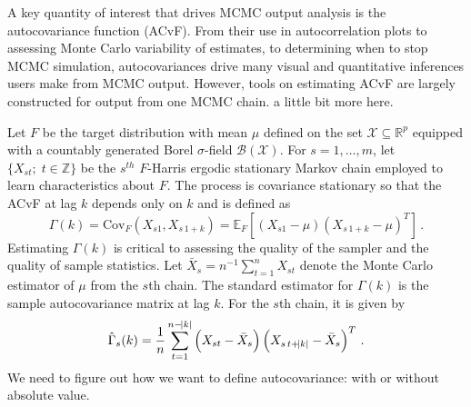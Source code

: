 \documentclass[11pt]{article}
\newcommand{\Cov}{\text{Cov}}
\newcommand{\X}{\mathcal{X}}
\theoremstyle{remark}
\begin{document}
A key quantity of interest that drives MCMC output analysis is the autocovariance function (ACvF). From their use in autocorrelation plots to assessing Monte Carlo variability of estimates, to determining when to stop MCMC simulation, autocovariances drive many visual and quantitative inferences users make from MCMC output. However, tools on estimating ACvF are largely constructed for output from one MCMC chain. {\color{blue} a little bit more here}.


Let $F$ be the target distribution with mean $\mu$ defined on the set $\X \subseteq \mathbb{R}^p$ equipped with a countably generated Borel $\sigma$-field $\mathcal{B}(\X)$. For $s = 1, \dots, m$, let $\{X_{st}; \; t \in \mathbb{Z}\}$ be the $s^{th}$ $F$-Harris ergodic stationary Markov chain \citep[see][for definitions]{meyn:twee:2009} employed to learn characteristics about $F$.
The process is covariance stationary so that
the ACvF at lag $k$ depends only on $k$ and is defined as 
%
\[
    \Gamma(k) = \Cov_F(X_{s1}, X_{s\,1+k})= \mathbb{E}_F \left[(X_{s1} - \mu)(X_{s\,1+k} - \mu)^T \right]\,.
\]
Estimating $\Gamma(k)$ is critical to assessing the quality of the sampler and the quality of sample statistics. Let $\bar{X}_s = n^{-1} \sum_{t=1}^{n} X_{st}$ denote the Monte Carlo estimator of $\mu$ from the $s$th chain. The standard estimator for $\Gamma(k)$ is the sample autocovariance matrix at lag $k$. For the $s$th chain, it is given by
%
\begin{equation} \label{eq:empirical_ACvF}
    \hat{\Gamma}_s(k) = \dfrac{1}{n}\sum_{t=1}^{n-\abs{k}} \left(X_{st} - \bar{X}_s \right) \left(X_{s\, t+\abs{k}} - \bar{X}_s \right)^T\,.
\end{equation}
{\color{red} We need to figure out how we want to define autocovariance: with or without absolute value.}
%
\end{document}
